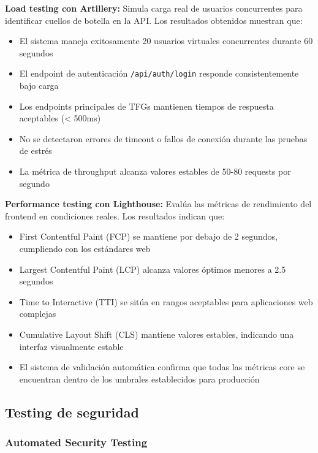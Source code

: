 \documentclass[12pt,a4paper,oneside]{report}
\begin{document}
\textbf{Load testing con Artillery:} Simula carga real de usuarios concurrentes para identificar cuellos de botella en la API. Los resultados obtenidos muestran que:
\begin{itemize}
\item El sistema maneja exitosamente 20 usuarios virtuales concurrentes durante 60 segundos
\item El endpoint de autenticación \texttt{/api/auth/login} responde consistentemente bajo carga
\item Los endpoints principales de TFGs mantienen tiempos de respuesta aceptables (< 500ms)
\item No se detectaron errores de timeout o fallos de conexión durante las pruebas de estrés
\item La métrica de throughput alcanza valores estables de 50-80 requests por segundo
\end{itemize}

\textbf{Performance testing con Lighthouse:} Evalúa las métricas de rendimiento del frontend en condiciones reales. Los resultados indican que:
\begin{itemize}
\item First Contentful Paint (FCP) se mantiene por debajo de 2 segundos, cumpliendo con los estándares web
\item Largest Contentful Paint (LCP) alcanza valores óptimos menores a 2.5 segundos
\item Time to Interactive (TTI) se sitúa en rangos aceptables para aplicaciones web complejas
\item Cumulative Layout Shift (CLS) mantiene valores estables, indicando una interfaz visualmente estable
\item El sistema de validación automática confirma que todas las métricas core se encuentran dentro de los umbrales establecidos para producción
\end{itemize}

\subsection{Testing de seguridad}\label{testing-de-seguridad}

\subsubsection{Automated Security
Testing}\label{automated-security-testing}
\end{document}

